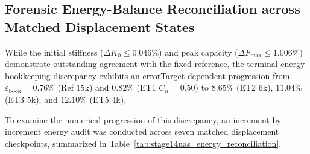 \subsection{Forensic Energy-Balance Reconciliation across Matched Displacement States}
While the initial stiffness ($\Delta K_0 \le 0.046\%$) and peak capacity ($\Delta F_{\max} \le 1.006\%$) demonstrate outstanding agreement with the fixed reference, the terminal energy bookkeeping discrepancy exhibits an errorTarget-dependent progression from $\varepsilon_{\mathrm{book}} = 0.76\%$ (Ref 15k) and $0.82\%$ (ET1 $C_n=0.50$) to $8.65\%$ (ET2 6k), $11.04\%$ (ET3 5k), and $12.10\%$ (ET5 4k).

To examine the numerical progression of this discrepancy, an increment-by-increment energy audit was conducted across seven matched displacement checkpoints, summarized in Table~\ref{tab:stage14uas_energy_reconciliation}.

